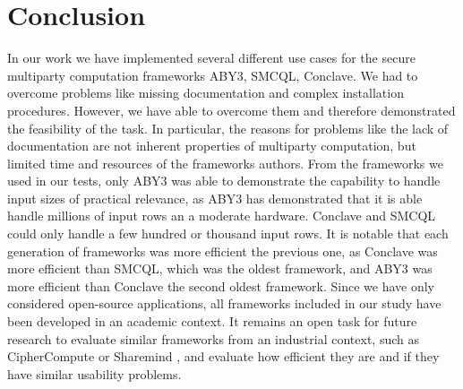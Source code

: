 \chapter{Conclusion}
 In our work we have implemented several different use cases for the secure multiparty computation frameworks ABY3, SMCQL, Conclave. We had to overcome problems like missing documentation and complex installation procedures. However, we have able to overcome them and therefore demonstrated the feasibility of the task. 
 In particular, the reasons for problems like the lack of documentation are not inherent properties of multiparty computation, but limited time and resources of the frameworks authors. From the frameworks we used in our tests, only ABY3 was able to demonstrate the capability to handle input sizes of practical relevance, as ABY3 has demonstrated that it is able handle millions of input rows an a moderate hardware. Conclave and SMCQL could only handle a few hundred or thousand input rows. It is notable that each generation of frameworks was more efficient the previous one, as Conclave was more efficient than SMCQL, which was the oldest framework, and ABY3 was more efficient than Conclave the second oldest framework. 
 Since we have only considered open-source applications, all frameworks included in our study have been developed in an academic context. It remains an open task for future research to evaluate similar frameworks from an industrial context, such as CipherCompute or Sharemind \cite{bogdanov2008sharemind}, and evaluate how efficient they are and if they have similar usability problems. 


